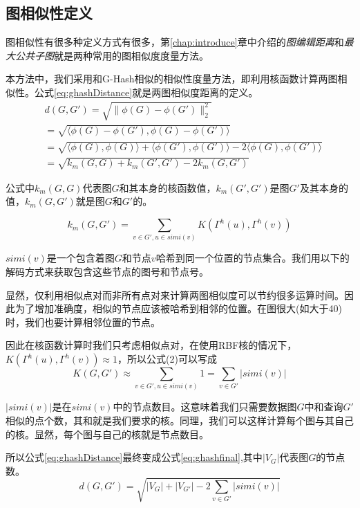 \documentclass{XDBAthesis}
\begin{document}
\subsection{图相似性定义}
图相似性有很多种定义方式有很多，第\ref{chap:introduce}章中介绍的\emph{图编辑距离}和\emph{最大公共子图}就是两种常用的图相似度度量方法。

本方法中，我们采用和G-Hash相似的相似性度量方法，即利用核函数计算两图相似性。公式\ref{eq:ghashDistance}就是两图相似度距离的定义。
\begin{equation}
\begin{split}
    &d(G,G')=\sqrt{\|\phi(G)-\phi(G')\|_{2}^{2}}\\
              &=\sqrt{\langle\phi(G)-\phi(G'),\phi(G)-\phi(G')\rangle}\\
              &=\sqrt{\langle\phi(G),\phi(G)\rangle+\langle\phi(G'),\phi(G')\rangle-2\langle\phi(G),\phi(G')\rangle}\\
              &=\sqrt{k_{m}(G,G)+k_{m}(G',G')-2k_{m}(G,G')}
\end{split}
\label{eq:ghashDistance}
\end{equation}

公式中$k_{m}(G,G)$代表图$G$和其本身的核函数值，$k_{m}(G',G')$是图$G'$及其本身的值，$k_{m}(G,G')$就是图$G$和$G'$的。

\begin{equation}
k_{m}(G,G')=\sum_{v\in G',u\in simi(v)}K(\Gamma^{h}(u),\Gamma^{h}(v))
\end{equation}

$simi(v)$是一个包含着图$G$和节点$v$哈希到同一个位置的节点集合。我们用以下的解码方式来获取包含这些节点的图号和节点号。

显然，仅利用相似点对而非所有点对来计算两图相似度可以节约很多运算时间。因此为了增加准确度，相似的节点应该被哈希到相邻的位置。在图很大(如大于40)时，我们也要计算相邻位置的节点。

因此在核函数计算时我们只考虑相似点对，在使用RBF核的情况下，$K(\Gamma^{h}(u),\Gamma^{h}(v))\approx1$，所以公式(2)可以写成
\begin{equation}
    K(G,G')\approx\sum_{v\in G',u\in simi(v)}1=\sum_{v\in G'}|simi(v)| 
\end{equation}

$|simi(v)|$是在$simi(v)$中的节点数目。这意味着我们只需要数据图$G$中和查询$G'$相似的点个数，其和就是我们要求的核。同理，我们可以这样计算每个图与其自己的核。显然，每个图与自己的核就是节点数目。

所以公式\ref{eq:ghashDistance}最终变成公式\ref{eq:ghashfinal},其中$|V_{G}|$代表图$G$的节点数。
\begin{equation}
    d(G,G')=\sqrt{|V_{G}|+|V_{G'}| -2\sum_{v\in G'}|simi(v)| }
    \label{eq:ghashfinal}
\end{equation}
\end{document}
